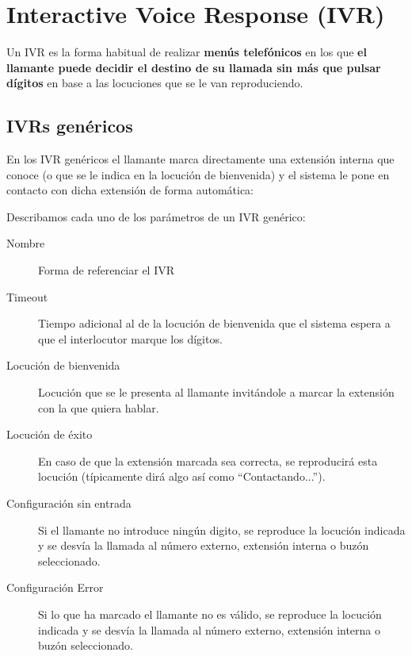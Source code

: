 \documentclass[letterpaper,10pt,spanish]{sphinxmanual}
\begin{document}
\section{Interactive Voice Response (IVR)}
\label{pbx_features/ivrs::doc}\label{pbx_features/ivrs:interactive-voice-response-ivr}
Un IVR es la forma habitual de realizar \textbf{menús telefónicos} en los que \textbf{el llamante puede decidir el destino de su llamada sin más que pulsar dígitos} en base a las locuciones que se le van reproduciendo.


\subsection{IVRs genéricos}
\label{pbx_features/ivrs:generic-ivrs}\label{pbx_features/ivrs:id1}
En los IVR genéricos el llamante marca directamente una extensión interna que conoce (o que se le indica en la locución de bienvenida) y el sistema le pone en contacto con dicha extensión de forma automática:

Describamos cada uno de los parámetros de un IVR genérico:
\begin{description}
\item[{Nombre}] \leavevmode{}\label{pbx_features/ivrs:term-name}
Forma de referenciar el IVR

\item[{Timeout}] \leavevmode{}\label{pbx_features/ivrs:term-timeout}
Tiempo adicional al de la locución de bienvenida que el sistema espera a que el interlocutor marque los dígitos.

\item[{Locución de bienvenida}] \leavevmode{}\label{pbx_features/ivrs:term-welcome-locution}
Locución que se le presenta al llamante invitándole a marcar la extensión con la que quiera hablar.

\item[{Locución de éxito}] \leavevmode{}\label{pbx_features/ivrs:term-success-locution}
En caso de que la extensión marcada sea correcta, se reproducirá esta locución (típicamente dirá algo así como ``Contactando...'').

\item[{Configuración sin entrada}] \leavevmode{}\label{pbx_features/ivrs:term-no-input-process}
Si el llamante no introduce ningún digito, se reproduce la locución indicada y se desvía la llamada al número externo, extensión interna o buzón seleccionado.

\item[{Configuración Error}] \leavevmode{}\label{pbx_features/ivrs:term-error-process}
Si lo que ha marcado el llamante no es válido, se reproduce la locución indicada y se desvía la llamada al número externo, extensión interna o buzón seleccionado.

\end{description}
\end{document}
